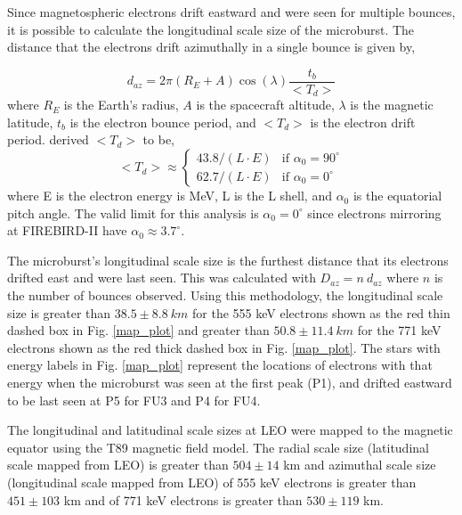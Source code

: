 \documentclass[draft,linenumbers]{agujournal}
\begin{document}
Since magnetospheric electrons drift eastward and were seen for multiple bounces, it is possible to calculate the longitudinal scale size of the microburst. The distance that the electrons drift azimuthally in a single bounce is given by, 

\begin{equation}
d_{az} = 2 \pi (R_E + A) \cos(\lambda) \frac{t_b}{<T_{d}>}
\label{bounce_drift}
\end{equation} where $R_E$ is the Earth's radius, $A$ is the spacecraft altitude, $\lambda$ is the magnetic latitude, $t_b$ is the electron bounce period, and $<T_{d}>$ is the electron drift period. \citet{Parks03} derived $<T_{d}>$ to be,
\begin{equation}
<T_{d}> \approx
\begin{cases}
43.8 /(L \cdot E) & \text{if } \alpha_0 = 90^{\circ} \\    62.7/(L \cdot E) & \text{if } \alpha_0 = 0^{\circ}
\end{cases}
\label{drift}
\end{equation} where E is the electron energy is MeV, L is the L shell, and $\alpha_0$ is the equatorial pitch angle. The valid limit for this analysis is $\alpha_0 = 0^{\circ}$ since electrons mirroring at FIREBIRD-II have $\alpha_0 \approx 3.7^{\circ}$. 

The microburst's longitudinal scale size is the furthest distance that its electrons drifted east and were last seen. This was calculated with $D_{az} = n \ d_{az}$ where $n$ is the number of bounces observed. Using this methodology, the longitudinal scale size is greater than $ 38.5 \pm 8.8 \ km$ for the 555 keV electrons shown as the red thin dashed box in Fig. \ref{map_plot} and greater than $ 50.8 \pm 11.4 \ km$ for the 771 keV electrons shown as the red thick dashed box in Fig. \ref{map_plot}. The stars with energy labels in Fig. \ref{map_plot} represent the locations of electrons with that energy when the microburst was seen at the first peak (P1), and drifted eastward to be last seen at P5 for FU3 and P4 for FU4.

The longitudinal and latitudinal scale sizes at LEO were mapped to the magnetic equator using the T89 magnetic field model. The radial scale size (latitudinal scale mapped from LEO) is greater than $504 \pm​ 14$ km and azimuthal scale size (longitudinal scale mapped from LEO) of 555 keV electrons is greater than $451 \pm 103$ km and of 771 keV electrons is greater than $530 \pm 119$ km.
\end{document}
